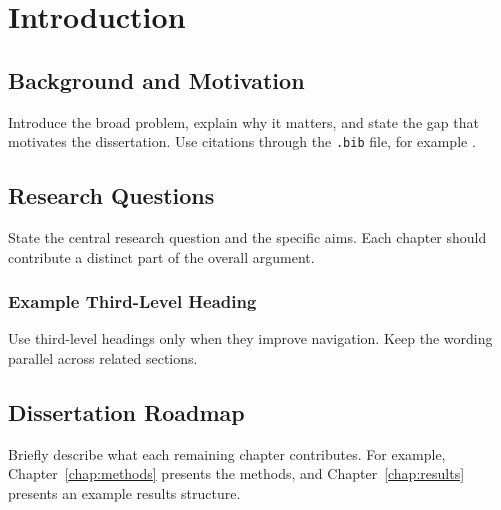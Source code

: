\chapter{Introduction}\label{chap:introduction}

\section{Background and Motivation}

Introduce the broad problem, explain why it matters, and state the gap that motivates the dissertation. Use citations through the \texttt{.bib} file, for example \citep{knuth1984}.

\section{Research Questions}

State the central research question and the specific aims. Each chapter should contribute a distinct part of the overall argument.

\subsection{Example Third-Level Heading}

Use third-level headings only when they improve navigation. Keep the wording parallel across related sections.

\section{Dissertation Roadmap}

Briefly describe what each remaining chapter contributes. For example, Chapter~\ref{chap:methods} presents the methods, and Chapter~\ref{chap:results} presents an example results structure.
